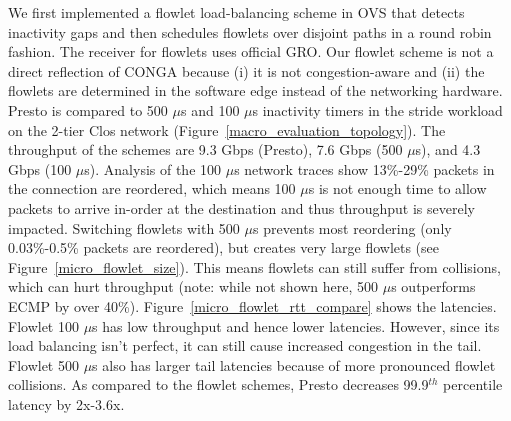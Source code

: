 We first implemented a flowlet load-balancing scheme in OVS that detects
inactivity gaps and then schedules flowlets over disjoint paths in a round robin fashion.
The receiver for flowlets uses official GRO.
Our flowlet scheme is not a direct reflection of CONGA because (i) it is not 
congestion-aware and (ii) the flowlets are determined in the software edge
instead of the networking hardware.
Presto is compared to 500 $\mu$s and 100 $\mu$s inactivity timers in
the stride workload on the 2-tier Clos network (Figure~\ref{macro_evaluation_topology}).
The throughput of the schemes are 9.3 Gbps (Presto), 7.6 Gbps (500 $\mu$s), and 4.3 Gbps (100 $\mu$s).
Analysis of the 100 $\mu$s
network traces show 13\%-29\% packets in the connection are reordered, which means 100 $\mu$s is not enough
time to allow packets to arrive in-order at the destination and thus throughput is severely impacted. Switching flowlets with 500 $\mu$s prevents
most reordering (only 0.03\%-0.5\% packets are reordered), but creates very large flowlets (see Figure~\ref{micro_flowlet_size}). This means
flowlets can still suffer from collisions, which can hurt throughput (note: while not shown here, 500 $\mu$s outperforms ECMP by over 40\%).
Figure~\ref{micro_flowlet_rtt_compare} shows the
latencies. Flowlet 100 $\mu$s has low throughput and hence lower latencies. However, since
its load balancing isn't perfect, it can still cause increased congestion in the tail. Flowlet 500 $\mu$s
also has larger tail latencies because of more pronounced flowlet collisions. As compared to the flowlet
schemes, Presto decreases 99.9$^{th}$ percentile latency by 2x-3.6x.



